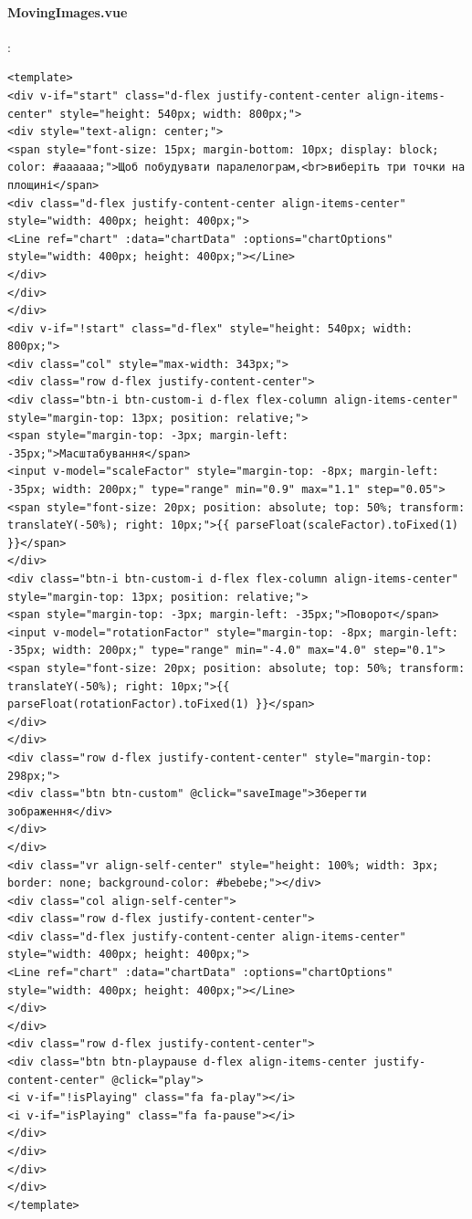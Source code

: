\documentclass[oneside,14pt]{extarticle}
\begin{document}
\begin{normalsize}
		\paragraph{MovingImages.vue}
		:
		\begin{tiny}
		\begin{lstlisting}
<template>
<div v-if="start" class="d-flex justify-content-center align-items-center" style="height: 540px; width: 800px;">
<div style="text-align: center;">
<span style="font-size: 15px; margin-bottom: 10px; display: block; color: #aaaaaa;">Щоб побудувати паралелограм,<br>виберіть три точки на площині</span>
<div class="d-flex justify-content-center align-items-center" style="width: 400px; height: 400px;">
<Line ref="chart" :data="chartData" :options="chartOptions" style="width: 400px; height: 400px;"></Line>
</div>
</div>
</div>
<div v-if="!start" class="d-flex" style="height: 540px; width: 800px;">
<div class="col" style="max-width: 343px;">
<div class="row d-flex justify-content-center">
<div class="btn-i btn-custom-i d-flex flex-column align-items-center" style="margin-top: 13px; position: relative;">
<span style="margin-top: -3px; margin-left: -35px;">Масштабування</span>
<input v-model="scaleFactor" style="margin-top: -8px; margin-left: -35px; width: 200px;" type="range" min="0.9" max="1.1" step="0.05">
<span style="font-size: 20px; position: absolute; top: 50%; transform: translateY(-50%); right: 10px;">{{ parseFloat(scaleFactor).toFixed(1) }}</span>
</div>
<div class="btn-i btn-custom-i d-flex flex-column align-items-center" style="margin-top: 13px; position: relative;">
<span style="margin-top: -3px; margin-left: -35px;">Поворот</span>
<input v-model="rotationFactor" style="margin-top: -8px; margin-left: -35px; width: 200px;" type="range" min="-4.0" max="4.0" step="0.1">
<span style="font-size: 20px; position: absolute; top: 50%; transform: translateY(-50%); right: 10px;">{{ parseFloat(rotationFactor).toFixed(1) }}</span>
</div>
</div>
<div class="row d-flex justify-content-center" style="margin-top: 298px;">
<div class="btn btn-custom" @click="saveImage">Зберегти зображення</div>
</div>
</div>
<div class="vr align-self-center" style="height: 100%; width: 3px; border: none; background-color: #bebebe;"></div>
<div class="col align-self-center">
<div class="row d-flex justify-content-center">
<div class="d-flex justify-content-center align-items-center" style="width: 400px; height: 400px;">
<Line ref="chart" :data="chartData" :options="chartOptions" style="width: 400px; height: 400px;"></Line>
</div>
</div>
<div class="row d-flex justify-content-center">
<div class="btn btn-playpause d-flex align-items-center justify-content-center" @click="play">
<i v-if="!isPlaying" class="fa fa-play"></i>
<i v-if="isPlaying" class="fa fa-pause"></i>
</div>
</div>
</div>
</div>
</template>


\end{lstlisting}
\end{tiny}
\end{normalsize}
\end{document}
